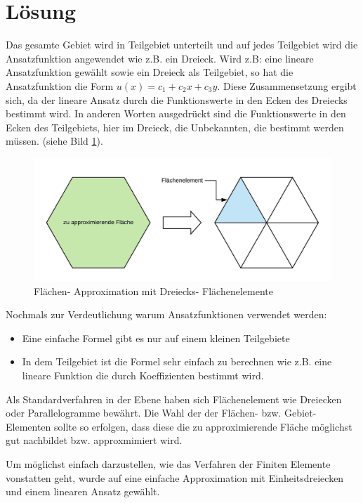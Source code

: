 %
%
%
\section{Lösung
\label{fem:section:loesung}}
Das gesamte Gebiet wird in Teilgebiet unterteilt und auf jedes Teilgebiet wird die Ansatzfunktion angewendet wie z.B. ein Dreieck. Wird z.B: eine lineare Ansatzfunktion gewählt sowie ein Dreieck als Teilgebiet, so hat die Ansatzfunktion die Form $u(x) = c_1 + c_2x + c_3y$. Diese Zusammensetzung ergibt sich, da der lineare Ansatz durch die Funktionswerte in den Ecken des Dreiecks bestimmt wird. In anderen Worten ausgedrückt sind die Funktionswerte in den Ecken des Teilgebiets, hier im Dreieck, die Unbekannten, die bestimmt werden müssen.
(siehe Bild \ref{fem:Approx}).\\

\begin{figure}[h!]
	\centering
	\includegraphics[scale=0.8]{papers/fem/Images/Approx.jpeg}
	\caption{Flächen- Approximation mit Dreiecks- Flächenelemente}
	\label{fem:Approx}
\end{figure}
Nochmals zur Verdeutlichung warum Ansatzfunktionen verwendet werden:
\begin{itemize}
	\item Eine einfache Formel gibt es nur auf einem kleinen Teilgebiete
	\item In dem Teilgebiet ist die Formel sehr einfach zu berechnen wie z.B. eine lineare Funktion die durch Koeffizienten bestimmt wird.
\end{itemize}
Als Standardverfahren in der Ebene haben sich Flächenelement wie Dreiecken oder Parallelogramme bewährt. Die Wahl der  der Flächen- bzw. Gebiet- Elementen sollte so erfolgen, dass diese die zu approximierende Fläche möglichst gut nachbildet bzw. approxmimiert wird.

Um möglichst einfach darzustellen, wie das Verfahren der Finiten Elemente vonstatten geht, wurde auf eine einfache Approximation mit Einheitsdreiecken und einem linearen Ansatz gewählt. 


